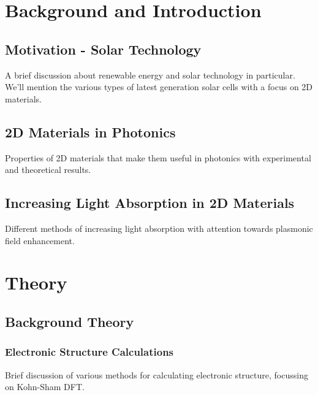 \documentclass[11pt]{report}
\begin{document}



\clearpage
\tableofcontents

\clearpage
\listoffigures

\setlength{\topmargin}{0.4cm}
\setlength{\headsep}{0.6cm}

\clearpage
\chapter{Background and Introduction}

\section{Motivation - Solar Technology}
A brief discussion about renewable energy and solar technology in particular.
We'll mention the various types of latest generation solar cells with a focus
on 2D materials.
\section{2D Materials in Photonics}
Properties of 2D materials that make them useful in photonics with
experimental and theoretical results.
\section{Increasing Light Absorption in 2D Materials}
Different methods of increasing light absorption with attention towards
plasmonic field enhancement.
%
%
%
%

\clearpage
\chapter{Theory}

\section{Background Theory}
\subsection{Electronic Structure Calculations}
Brief discussion of various methods for calculating electronic structure,
focussing on Kohn-Sham DFT.
\end{document}
